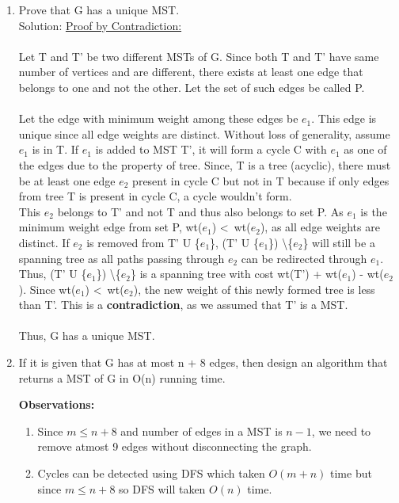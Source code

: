 \documentclass[a4paper]{article}
\begin{document}
\begin{enumerate}[label=(\alph*)]
    
    \item Prove that G has a unique MST.\\
    \newline Solution: \underline{Proof by Contradiction:}\\\\
    Let T and T' be two different MSTs of G. Since both T and T' have same number of vertices and are different, there exists at least one edge that belongs to one and not the other. Let the set of such edges be called P.\\\\
    Let the edge with minimum weight among these edges be $e_1$. This edge is unique since all edge weights are distinct. Without loss of generality, assume $e_1$ is in T. If $e_1$ is added to MST T', it will form a cycle C with $e_1$ as one of the edges due to the property of tree. Since, T is a tree (acyclic), there must be at least one edge $e_2$ present in cycle C but not in T because if only edges from tree T is present in cycle C, a cycle wouldn't form.\\
    This $e_2$ belongs to T' and not T and thus also belongs to set P. As $e_1$ is the minimum weight edge from set P, wt($e_1$) \textless \ wt($e_2$), as all edge weights are distinct. If $e_2$ is removed from T' U \{$e_1$\}, (T' U \{$e_1$\}) \textbackslash \{$e_2$\} will still be a spanning tree as all paths passing through $e_2$ can be redirected through $e_1$. \\
    Thus, (T' U \{$e_1$\}) \textbackslash \{$e_2$\} is a spanning tree with cost wt(T') + wt($e_1$) - wt($e_2$). Since wt($e_1$) \textless \ wt($e_2$), the new weight of this newly formed tree is less than T'. This is a \textbf{contradiction}, as we assumed that T' is a MST.\\\\
    Thus, G has a unique MST. {\hfill\qedsymbol}
    
    \newpage
    \item If it is given that G has at most n + 8 edges, then design an algorithm that returns a MST of G in O(n) running time.
    
    \textbf{Observations:}
    \begin{enumerate}[1)]
        \item Since $m \leq n+8$ and number of edges in a MST is $n-1$, we need to remove atmost 9 edges without disconnecting the graph.
        \item Cycles can be detected using DFS which taken $O(m+n)$ time but since $m \leq n+8$ so DFS will taken $O(n)$ time.
    \end{enumerate}
    

\end{enumerate}
\end{document}
